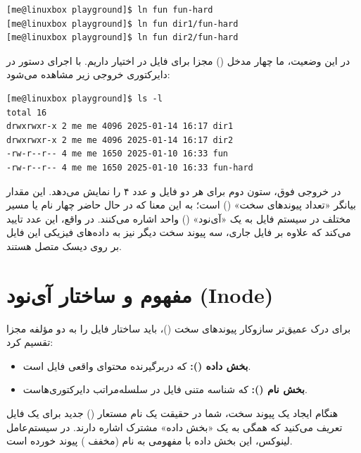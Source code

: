 \begin{latin}
\begin{lstlisting}
[me@linuxbox playground]$ ln fun fun-hard
[me@linuxbox playground]$ ln fun dir1/fun-hard
[me@linuxbox playground]$ ln fun dir2/fun-hard
\end{lstlisting}
\end{latin}

در این وضعیت، ما چهار مدخل () مجزا برای فایل  در اختیار داریم. با اجرای دستور  در دایرکتوری  خروجی زیر مشاهده می‌شود:

\begin{latin}
\begin{lstlisting}
[me@linuxbox playground]$ ls -l
total 16
drwxrwxr-x 2 me me 4096 2025-01-14 16:17 dir1
drwxrwxr-x 2 me me 4096 2025-01-14 16:17 dir2
-rw-r--r-- 4 me me 1650 2025-01-10 16:33 fun
-rw-r--r-- 4 me me 1650 2025-01-10 16:33 fun-hard
\end{lstlisting}
\end{latin}

در خروجی فوق، ستون دوم برای هر دو فایل  و  عدد ۴ را نمایش می‌دهد. این مقدار بیانگر «تعداد پیوندهای سخت» () است؛ به این معنا که در حال حاضر چهار نام یا مسیر مختلف در سیستم فایل به یک «آی‌نود» () واحد اشاره می‌کنند. در واقع، این عدد تایید می‌کند که علاوه بر فایل جاری، سه پیوند سخت دیگر نیز به داده‌های فیزیکی این فایل بر روی دیسک متصل هستند.

\section{مفهوم و ساختار آی‌نود (Inode)}

برای درک عمیق‌تر سازوکار پیوندهای سخت ()، باید ساختار فایل را به دو مؤلفه مجزا تقسیم کرد:

\begin{itemize}
  \item \textbf{بخش داده ():} که دربرگیرنده محتوای واقعی فایل است.
  \item \textbf{بخش نام ():} که شناسه متنی فایل در سلسله‌مراتب دایرکتوری‌هاست.
\end{itemize}

هنگام ایجاد یک پیوند سخت، شما در حقیقت یک نام مستعار () جدید برای یک فایل تعریف می‌کنید که همگی به یک «بخش داده» مشترک اشاره دارند. در سیستم‌عامل لینوکس، این بخش داده با مفهومی به نام  (مخفف ) پیوند خورده است.

